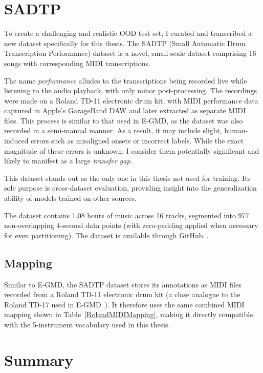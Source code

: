 \section{SADTP}

To create a challenging and realistic \acrfull{OOD} test set, I curated and transcribed a new dataset specifically for this thesis. The SADTP (Small Automatic Drum Transcription Performance) dataset is a novel, small-scale dataset comprising 16 songs with corresponding MIDI transcriptions. 

The name \textit{performance} alludes to the transcriptions being recorded live while listening to the audio playback, with only minor post-processing. The recordings were made on a Roland TD-11 electronic drum kit, with MIDI performance data captured in Apple's GarageBand \gls{DAW} and later extracted as separate MIDI files. This process is similar to that used in E-GMD, as the dataset was also recorded in a semi-manual manner. As a result, it may include slight, human-induced errors such as misaligned onsets or incorrect labels. While the exact magnitude of these errors is unknown, I consider them potentially significant and likely to manifest as a large \textit{transfer gap}.

This dataset stands out as the only one in this thesis not used for training. Its sole purpose is cross-dataset evaluation, providing insight into the generalization ability of models trained on other sources.

The dataset contains 1.08 hours of music across 16 tracks, segmented into 977 non-overlapping 4-second data points (with zero-padding applied when necessary for even partitioning). The dataset is available through GitHub~\cite{fosse_sadtp_2025}.

\subsection{Mapping}

Similar to E-GMD, the SADTP dataset stores its annotations as MIDI files recorded from a Roland TD-11 electronic drum kit (a close analogue to the Roland TD-17 used in E-GMD~\cite{callender2020improvingperceptualqualitydrum}). It therefore uses the same combined MIDI mapping shown in Table~\ref{RolandMIDIMapping}, making it directly compatible with the 5-instrument vocabulary used in this thesis.

\section{Summary}

